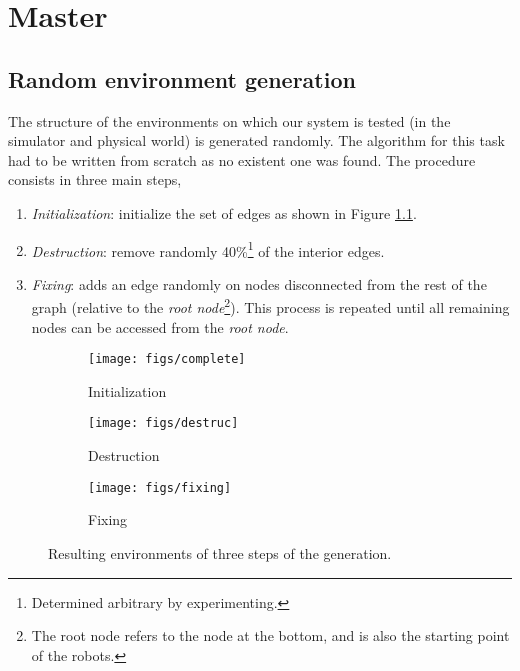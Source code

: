 \documentclass[12pt]{report}
\begin{document}
\chapter{Master}\label{chapter-master}

\section{Random environment generation}
The structure of the environments on which our system is tested (in the simulator and physical world) is generated randomly. The algorithm for this task had to be written from scratch as no existent one was found. The procedure consists in three main steps,
\begin{enumerate}
\item \textit{Initialization}: initialize the set of edges as shown in Figure \ref{fig:gener-a}.
\item \textit{Destruction}: remove randomly 40\%\footnote{Determined arbitrary by experimenting.} of the interior edges.
\item \textit{Fixing}: adds an edge randomly on nodes disconnected from the rest of the graph (relative to the \textit{root node}\footnote{The root node refers to the node at the bottom, and is also the starting point of the robots.}). This process is repeated until all remaining nodes can be accessed from the \textit{root node}.
\end{enumerate}

\begin{figure}[!h]
\centering
\begin{subfigure}{.3\textwidth}
  \centering
  \texttt{[image: figs/complete]}
  \caption{Initialization}
  \label{fig:gener-a}
\end{subfigure}%
\begin{subfigure}{.3\textwidth}
  \centering
  \texttt{[image: figs/destruc]}
  \caption{Destruction}
\end{subfigure}
\begin{subfigure}{.3\textwidth}
  \centering
  \texttt{[image: figs/fixing]}
  \caption{Fixing}
\end{subfigure}
\caption{Resulting environments of three steps of the generation.}
\label{fig:gener}
\end{figure}


\end{document}
